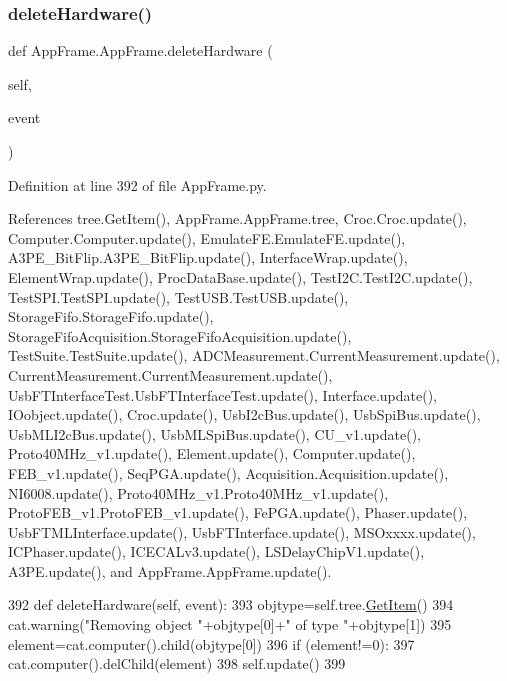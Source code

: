 \subsubsection{\texorpdfstring{delete\+Hardware()}{deleteHardware()}}
{\footnotesize\ttfamily def App\+Frame.\+App\+Frame.\+delete\+Hardware (\begin{DoxyParamCaption}\item[{}]{self,  }\item[{}]{event }\end{DoxyParamCaption})}



Definition at line 392 of file App\+Frame.\+py.



References tree.\+Get\+Item(), App\+Frame.\+App\+Frame.\+tree, Croc.\+Croc.\+update(), Computer.\+Computer.\+update(), Emulate\+F\+E.\+Emulate\+F\+E.\+update(), A3\+P\+E\+\_\+\+Bit\+Flip.\+A3\+P\+E\+\_\+\+Bit\+Flip.\+update(), Interface\+Wrap.\+update(), Element\+Wrap.\+update(), Proc\+Data\+Base.\+update(), Test\+I2\+C.\+Test\+I2\+C.\+update(), Test\+S\+P\+I.\+Test\+S\+P\+I.\+update(), Test\+U\+S\+B.\+Test\+U\+S\+B.\+update(), Storage\+Fifo.\+Storage\+Fifo.\+update(), Storage\+Fifo\+Acquisition.\+Storage\+Fifo\+Acquisition.\+update(), Test\+Suite.\+Test\+Suite.\+update(), A\+D\+C\+Measurement.\+Current\+Measurement.\+update(), Current\+Measurement.\+Current\+Measurement.\+update(), Usb\+F\+T\+Interface\+Test.\+Usb\+F\+T\+Interface\+Test.\+update(), Interface.\+update(), I\+Oobject.\+update(), Croc.\+update(), Usb\+I2c\+Bus.\+update(), Usb\+Spi\+Bus.\+update(), Usb\+M\+L\+I2c\+Bus.\+update(), Usb\+M\+L\+Spi\+Bus.\+update(), C\+U\+\_\+v1.\+update(), Proto40\+M\+Hz\+\_\+v1.\+update(), Element.\+update(), Computer.\+update(), F\+E\+B\+\_\+v1.\+update(), Seq\+P\+G\+A.\+update(), Acquisition.\+Acquisition.\+update(), N\+I6008.\+update(), Proto40\+M\+Hz\+\_\+v1.\+Proto40\+M\+Hz\+\_\+v1.\+update(), Proto\+F\+E\+B\+\_\+v1.\+Proto\+F\+E\+B\+\_\+v1.\+update(), Fe\+P\+G\+A.\+update(), Phaser.\+update(), Usb\+F\+T\+M\+L\+Interface.\+update(), Usb\+F\+T\+Interface.\+update(), M\+S\+Oxxxx.\+update(), I\+C\+Phaser.\+update(), I\+C\+E\+C\+A\+Lv3.\+update(), L\+S\+Delay\+Chip\+V1.\+update(), A3\+P\+E.\+update(), and App\+Frame.\+App\+Frame.\+update().


\begin{DoxyCode}
392     \textcolor{keyword}{def }deleteHardware(self, event):
393         objtype=self.tree.\hyperlink{namespacetree_a2d9ace69c820aa1a47a130d6f2563dd5}{GetItem}()
394         cat.warning(\textcolor{stringliteral}{"Removing object "}+objtype[0]+\textcolor{stringliteral}{" of type "}+objtype[1])
395         element=cat.computer().child(objtype[0])
396         \textcolor{keywordflow}{if} (element!=0):
397             cat.computer().delChild(element)
398         self.update()
399                         
\end{DoxyCode}
\mbox{\label{classAppFrame_1_1AppFrame_a2a55d9d4eead09d17e9f15e6a72806d1}} 
